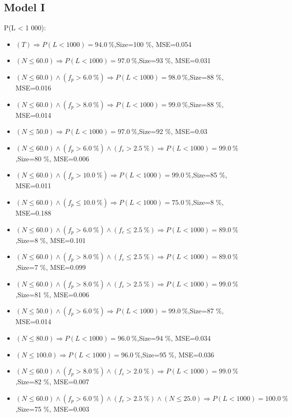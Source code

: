 \documentclass[numbered]{CSL}
\begin{document}
\subsection{Model I}
P(L < 1 000):
\begin{itemize}
\item $(T) \Rightarrow P(L < 1 000) = 94.0~\%$,\hfill Size=100 \%, MSE=0.054
\item $(N \leq 60.0) \Rightarrow P(L < 1 000) = 97.0~\%$,\hfill Size=93 \%, MSE=0.031
\item $(N \leq 60.0) \land (f_p > 6.0~\%) \Rightarrow P(L < 1 000) = 98.0~\%$,\hfill Size=88 \%, MSE=0.016
\item $(N \leq 60.0) \land (f_p > 8.0~\%) \Rightarrow P(L < 1 000) = 99.0~\%$,\hfill Size=88 \%, MSE=0.014
\item $(N \leq 50.0) \Rightarrow P(L < 1 000) = 97.0~\%$,\hfill Size=92 \%, MSE=0.03
\item $(N \leq 60.0) \land (f_p > 6.0~\%) \land (f_c > 2.5~\%) \Rightarrow P(L < 1 000) = 99.0~\%$,\hfill Size=80 \%, MSE=0.006
\item $(N \leq 60.0) \land (f_p > 10.0~\%) \Rightarrow P(L < 1 000) = 99.0~\%$,\hfill Size=85 \%, MSE=0.011
\item $(N \leq 60.0) \land (f_p \leq 10.0~\%) \Rightarrow P(L < 1 000) = 75.0~\%$,\hfill Size=8 \%, MSE=0.188
\item $(N \leq 60.0) \land (f_p > 6.0~\%) \land (f_c \leq 2.5~\%) \Rightarrow P(L < 1 000) = 89.0~\%$,\hfill Size=8 \%, MSE=0.101
\item $(N \leq 60.0) \land (f_p > 8.0~\%) \land (f_c \leq 2.5~\%) \Rightarrow P(L < 1 000) = 89.0~\%$,\hfill Size=7 \%, MSE=0.099
\item $(N \leq 60.0) \land (f_p > 8.0~\%) \land (f_c > 2.5~\%) \Rightarrow P(L < 1 000) = 99.0~\%$,\hfill Size=81 \%, MSE=0.006
\item $(N \leq 50.0) \land (f_p > 6.0~\%) \Rightarrow P(L < 1 000) = 99.0~\%$,\hfill Size=87 \%, MSE=0.014
\item $(N \leq 80.0) \Rightarrow P(L < 1 000) = 96.0~\%$,\hfill Size=94 \%, MSE=0.034
\item $(N \leq 100.0) \Rightarrow P(L < 1 000) = 96.0~\%$,\hfill Size=95 \%, MSE=0.036
\item $(N \leq 60.0) \land (f_p > 8.0~\%) \land (f_c > 2.0~\%) \Rightarrow P(L < 1 000) = 99.0~\%$,\hfill Size=82 \%, MSE=0.007
\item $(N \leq 60.0) \land (f_p > 6.0~\%) \land (f_c > 2.5~\%) \land (N \leq 25.0) \Rightarrow P(L < 1 000) = 100.0~\%$,\hfill Size=75 \%, MSE=0.003

\end{itemize}
\end{document}
